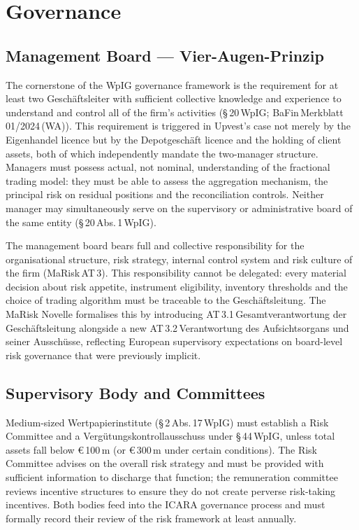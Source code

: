 \documentclass[12pt,a4paper]{report}
\newcommand{\eur}{\euro\,}
\begin{document}
\section{Governance}
\label{sec:governance}

\subsection{Management Board --- Vier-Augen-Prinzip}

The cornerstone of the WpIG governance framework is the requirement for at
least two Gesch{\"a}ftsleiter with sufficient collective knowledge and experience
to understand and control all of the firm's activities (\S\,20\,WpIG;
BaFin\,Merkblatt\,01/2024\,(WA)). This requirement is triggered in Upvest's
case not merely by the Eigenhandel licence but by the Depotgesch{\"a}ft licence
and the holding of client assets, both of which independently mandate the
two-manager structure. Managers must possess actual, not nominal, understanding
of the fractional trading model: they must be able to assess the aggregation
mechanism, the principal risk on residual positions and the reconciliation
controls. Neither manager may simultaneously serve on the supervisory or
administrative board of the same entity (\S\,20\,Abs.\,1\,WpIG).

The management board bears full and collective responsibility for the
organisational structure, risk strategy, internal control system and risk
culture of the firm (MaRisk\,AT\,3). This responsibility cannot be delegated:
every material decision about risk appetite, instrument eligibility, inventory
thresholds and the choice of trading algorithm must be traceable to the
Gesch{\"a}ftsleitung. The MaRisk Novelle formalises this by introducing
AT\,3.1\,Gesamtverantwortung der Gesch{\"a}ftsleitung alongside a new
AT\,3.2\,Verantwortung des Aufsichtsorgans und seiner Aussch{\"u}sse, reflecting
European supervisory expectations on board-level risk governance that were
previously implicit.

\subsection{Supervisory Body and Committees}

Medium-sized Wertpapierinstitute (\S\,2\,Abs.\,17\,WpIG) must establish a Risk
Committee and a Verg{\"u}tungskontrollausschuss under \S\,44\,WpIG, unless total
assets fall below \eur{}100\,m (or \eur{}300\,m under certain conditions). The
Risk Committee advises on the overall risk strategy and must be provided with
sufficient information to discharge that function; the remuneration committee
reviews incentive structures to ensure they do not create perverse risk-taking
incentives. Both bodies feed into the ICARA governance process and must formally
record their review of the risk framework at least annually.
\end{document}
